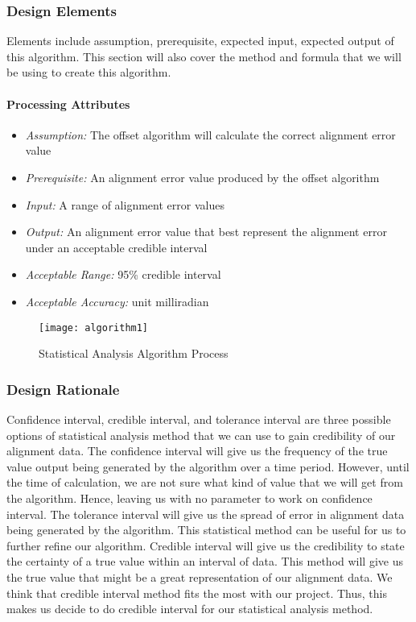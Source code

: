 		\subsubsection{Design Elements}
		Elements include assumption, prerequisite, expected input, expected output of this algorithm. This section will also cover the method and formula that we will be using to create this algorithm.

			\paragraph{Processing Attributes}
				\begin{itemize}
					\item \textit{Assumption:} The offset algorithm will calculate the correct alignment error value 
					\item \textit{Prerequisite:} An alignment error value produced by the offset algorithm 
					\item \textit{Input:} A range of alignment error values 
					\item \textit{Output:} An alignment error value that best represent the alignment error under an acceptable credible interval
					\item \textit{Acceptable Range:} 95\% credible interval 
					\item \textit{Acceptable Accuracy:} unit milliradian\\
				\end{itemize}

		\begin{figure}
			\centering
		 		\caption{Statistical Analysis Algorithm Process}			
		      	\texttt{[image: algorithm1]}
		    \label{fig:algorithm1}
		\end{figure}

		\subsubsection{Design Rationale}
		Confidence interval, credible interval, and tolerance interval are three possible options of statistical analysis method that we can use to gain credibility of our alignment data. The confidence interval will give us the frequency of the true value output being generated by the algorithm over a time period. However, until the time of calculation, we are not sure what kind of value that we will get from the algorithm. Hence, leaving us with no parameter to work on confidence interval. The tolerance interval will give us the spread of error in alignment data being generated by the algorithm. This statistical method can be useful for us to further refine our algorithm. Credible interval will give us the credibility to state the certainty of a true value within an interval of data. This method will give us the true value that might be a great representation of our alignment data. We think that credible interval method fits the most with our project. Thus, this makes us decide to do credible interval for our statistical analysis method.\\

